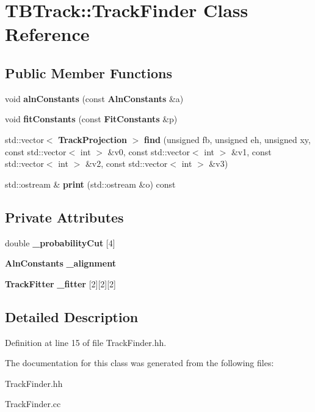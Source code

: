 \section{TBTrack::TrackFinder Class Reference}
\label{classTBTrack_1_1TrackFinder}
\subsection*{Public Member Functions}
\begin{DoxyCompactItemize}
\item 
void {\bfseries alnConstants} (const {\bf AlnConstants} \&a)\label{classTBTrack_1_1TrackFinder_a6cb7c604ec9cf38348f22d050cc7bb49}

\item 
void {\bfseries fitConstants} (const {\bf FitConstants} \&p)\label{classTBTrack_1_1TrackFinder_aa1c57148ca9c5c72afb5045fcd2b55d3}

\item 
std::vector$<$ {\bf TrackProjection} $>$ {\bfseries find} (unsigned fb, unsigned eh, unsigned xy, const std::vector$<$ int $>$ \&v0, const std::vector$<$ int $>$ \&v1, const std::vector$<$ int $>$ \&v2, const std::vector$<$ int $>$ \&v3)\label{classTBTrack_1_1TrackFinder_a6378897788259d0afcd9cf9e40761bba}

\item 
std::ostream \& {\bfseries print} (std::ostream \&o) const \label{classTBTrack_1_1TrackFinder_a0b01ceac7e2eef542eafa25d656ba1b4}

\end{DoxyCompactItemize}
\subsection*{Private Attributes}
\begin{DoxyCompactItemize}
\item 
double {\bfseries \_\-probabilityCut} [4]\label{classTBTrack_1_1TrackFinder_af4cc2dd72bf92295fbe97b2382b65e15}

\item 
{\bf AlnConstants} {\bfseries \_\-alignment}\label{classTBTrack_1_1TrackFinder_ab100899aad4b03c3844f0e662d3fa86a}

\item 
{\bf TrackFitter} {\bfseries \_\-fitter} [2][2][2]\label{classTBTrack_1_1TrackFinder_a6e2c245adc3633995c352d177de4367d}

\end{DoxyCompactItemize}


\subsection{Detailed Description}


Definition at line 15 of file TrackFinder.hh.

The documentation for this class was generated from the following files:\begin{DoxyCompactItemize}
\item 
TrackFinder.hh\item 
TrackFinder.cc\end{DoxyCompactItemize}
